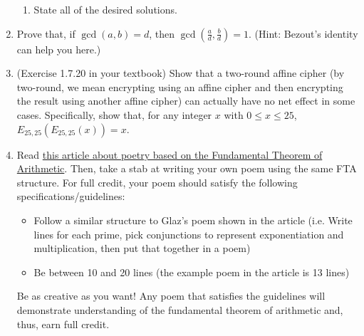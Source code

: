 \documentclass[12pt]{article}
\begin{document}
\begin{enumerate}
\begin{enumerate}
\item State all of the desired solutions.
\end{enumerate}
\item Prove that, if $\gcd(a,b)=d$, then $\gcd(\frac{a}{d},\frac{b}{d})=1$.  (Hint: Bezout's identity can help you here.)
\item (Exercise 1.7.20 in your textbook) Show that a two-round affine cipher (by two-round, we mean encrypting using an affine cipher and then encrypting the result using another affine cipher) can actually have no net effect in some cases. Specifically, show that, for any integer $x$ with $0\le x\le 25$, $E_{25,25}(E_{25,25}(x))=x$. 
\item Read \href{https://blogs.scientificamerican.com/roots-of-unity/prime-factorization-as-verse/}{this article about poetry based on the Fundamental Theorem of Arithmetic}.  Then, take a stab at writing your own poem using the same FTA structure. For full credit, your poem should satisfy the following specifications/guidelines:
\begin{itemize}
\item Follow a similar structure to Glaz's poem shown in the article (i.e.  Write lines for each prime, pick conjunctions to represent exponentiation and multiplication, then put that together in a poem)
\item Be between 10 and 20 lines (the example poem in the article is 13 lines)
\end{itemize}
Be as creative as you want! Any poem that satisfies the guidelines will demonstrate understanding of the fundamental theorem of arithmetic and, thus, earn full credit. 
\end{enumerate}
\end{document}
